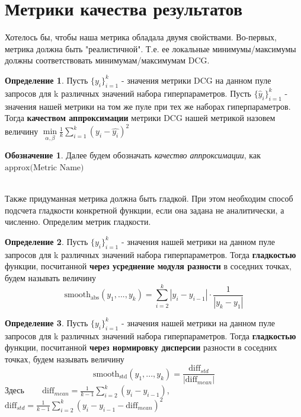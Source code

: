 \documentclass[14pt,a4paper]{amsart}
\theoremstyle{definition}
\newtheorem{definition}{Определение}[section]
\theoremstyle{definition}
\newtheorem{designation}{Обозначение}[section]
\newcommand{\Sum}{\sum\limits}
\renewcommand\i{\textit}
\renewcommand\t{\text}
\renewcommand\b{\textbf}
\begin{document}

\newpage
\section{Метрики качества результатов}

Хотелось бы, чтобы наша метрика обладала двумя свойствами. Во-первых, метрика должна быть "реалистичной". Т.е. ее локальные минимумы/максимумы должны соответствовать минимумам/максимумам DCG.
\begin{definition}
Пусть $\{y_i\}_{i=1}^k$ - значения метрики DCG на данном пуле запросов для k различных значений набора гиперпараметров. Пусть $\{\hat{y}_i\}_{i=1}^k$ - значения нашей метрики на том же пуле при тех же наборах гиперпараметров. Тогда \b{качеством аппроксимации} метрики DCG нашей метрикой назовем величину
$\underset{\alpha, \beta}{\min}\frac{1}{k}\Sum_{i=1}^k (y_i - \hat{y_i})^2$
\end{definition}

\begin{designation}
Далее будем обозначать \i{качество аппроксимации}, как $\t{approx(Metric Name)}$
\end{designation}

~\\

Также придуманная метрика должна быть гладкой. При этом необходим способ подсчета гладкости конкретной функции, если она задана не аналитически, а численно. Определим метрик гладкости.

\begin{definition}
Пусть $\{y_i\}_{i=1}^k$ - значения нашей метрики на данном пуле запросов для k различных значений набора гиперпараметров. Тогда \b{гладкостью} функции, посчитанной \b{через усреднение модуля разности} в соседних точках, будем называть величину 
$$\t{smooth}_\t{abs}(y_1,...,y_k) = \Sum_{i=2}^k |y_i - y_{i-1}| \cdot \frac{1}{|y_k - y_1|}$$
\end{definition}

\begin{definition}
Пусть $\{y_i\}_{i=1}^k$ - значения нашей метрики на данном пуле запросов для k различных значений набора гиперпараметров. Тогда \b{гладкостью} функции, посчитанной \b{через нормировку дисперсии} разности в соседних точках, будем называть величину 
$$\t{smooth}_\t{std}(y_1,...,y_k) = \frac{\t{diff}_{std}}{|\t{diff}_{mean}|}$$
Здесь ~~~ $\t{diff}_{mean} = \frac{1}{k - 1} \Sum_{i=2}^k (y_i - y_{i-1})$, ~~~
$\t{diff}_{std} = \frac{1}{k - 1} \Sum_{i=2}^k (y_i - y_{i-1} - \t{diff}_{mean})^2$
\end{definition}
\end{document}
